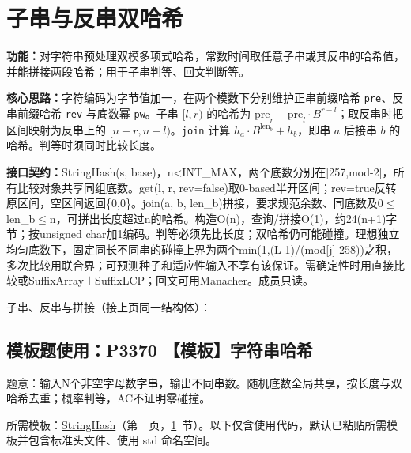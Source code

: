 \section{子串与反串双哈希}\label{compact-StringHash}

\noindent\textbf{功能：}\allowbreak 对字符串预处理双模多项式哈希，常数时间取任意子串或其反串的哈希值，并能拼接两段哈希；用于子串判等、回文判断等。

\textbf{核心思路：}\allowbreak 字符编码为字节值加一，在两个模数下分别维护正串前缀哈希 \texttt{pre}、反串前缀哈希 \texttt{rev} 与底数幂 \texttt{pw}。子串 $[l,r)$ 的哈希为 $\mathrm{pre}_r-\mathrm{pre}_l\cdot B^{r-l}$；取反串时把区间映射为反串上的 $[n-r,n-l)$。\texttt{join} 计算 $h_a\cdot B^{\mathrm{len}_b}+h_b$，即串 $a$ 后接串 $b$ 的哈希。判等时须同时比较长度。



{\sloppy{}\noindent\textbf{接口契约：}StringHash(s, base)，n<INT\_MAX，两个底数分别在[257,mod-2]，所有比较对象共享同组底数。get(l, r, rev=false)取0-based半开区间；rev=true反转原区间，空区间返回\{0,0\}。join(a, b, len\_b)拼接，要求规范余数、同底数及0$\le$len\_b$\le$n，可拼出长度超过n的哈希。构造O(n)，查询/拼接O(1)，约24(n+1)字节；按unsigned char加1编码。判等必须先比长度；双哈希仍可能碰撞。理想独立均匀底数下，固定同长不同串的碰撞上界为两个min(1,(L-1)/(mod[j]-258))之积，多次比较用联合界；可预测种子和适应性输入不享有该保证。需确定性时用直接比较或SuffixArray＋SuffixLCP；回文可用Manacher。成员只读。\par}

\Needspace{373pt}



\newpage

\noindent 子串、反串与拼接（接上页同一结构体）：



\Needspace{399pt}

\subsection*{模板题使用：P3370 【模板】字符串哈希}

\label{usage-example-368}

题意：输入N个非空字母数字串，输出不同串数。随机底数全局共享，按长度与双哈希去重；概率判等，AC不证明零碰撞。

所需模板：\hyperref[compact-StringHash]{StringHash}（第~\pageref{compact-StringHash}~页，\ref{compact-StringHash}~节）。以下仅含使用代码，默认已粘贴所需模板并包含标准头文件、使用 std 命名空间。

